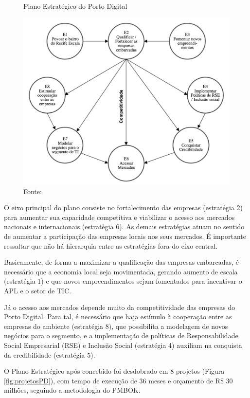 \begin{figure}[h]
\caption{Plano Estratégico do Porto Digital}
\centerline{\includegraphics[scale=0.5]{img/estrategiasPD}}
\label{fig:estrategiasPD}
\caption* {Fonte: }
\end{figure}

O eixo principal do plano consiste no fortalecimento das empresas (estratégia 2) para aumentar sua capacidade competitiva e viabilizar o acesso aos mercados nacionais e internacionais (estratégia 6). As demais estratégias atuam no sentido de aumentar a participação das empresas locais nos seus mercados. É importante ressaltar que não há hierarquia entre as estratégias fora do eixo central.

Basicamente, de forma a maximizar a qualificação das empresas embarcadas, é necessário que a economia local seja movimentada, gerando aumento de escala (estratégia 1) e que novos empreendimentos sejam fomentados para incentivar o APL e o setor de TIC. 

Já o acesso aos mercados depende muito da competitividade das empresas do Porto Digital. Para tal, é necessário que haja estímulo à cooperação entre as empresas do ambiente (estratégia 8), que possibilita a modelagem de novos negócios para o segmento, e a implementação de políticas de Responsabilidade Social Empresarial (RSE) e Inclusão Social (estratégia 4) auxiliam na conquista da credibilidade (estratégia 5).

O Plano Estratégico após concebido foi desdobrado em 8 projetos (Figura \ref{fig:projetosPD}), com tempo de execução de 36 meses e orçamento de R\$ 30 milhões, seguindo a metodologia do PMBOK. 

